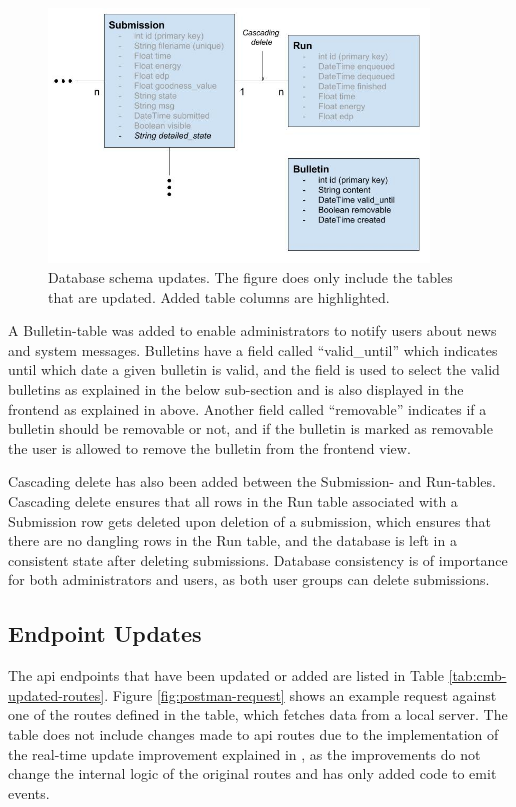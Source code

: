 \begin{figure}
    \includegraphics[width=0.9\textwidth]{figs/updated_database_schema.jpg}
    \caption[Database schema updates]{Database schema updates. The figure does only include the tables that are updated. Added table columns are highlighted.}
    \label{fig:updated-database-schema}
\end{figure}

A Bulletin-table was added to enable administrators to notify users about news and system messages. Bulletins have a field called ``valid\_until'' which indicates until which date a given bulletin is valid, and the field is used to select the valid bulletins as explained in the below sub-section and is also displayed in the frontend as explained in  above. Another field called ``removable'' indicates if a bulletin should be removable or not, and if the bulletin is marked as removable the user is allowed to remove the bulletin from the frontend view.

Cascading delete has also been added between the Submission- and Run-tables. Cascading delete ensures that all rows in the Run table associated with a Submission row gets deleted upon deletion of a submission, which ensures that there are no dangling rows in the Run table, and the database is left in a consistent state after deleting submissions. Database consistency is of importance for both administrators and users, as both user groups can delete submissions.

\subsection{Endpoint Updates}
\label{sub-sec:impr-server-endpoint}
The \gls{api} endpoints that have been updated or added are listed in Table \ref{tab:cmb-updated-routes}. Figure \ref{fig:postman-request} shows an example request against one of the routes defined in the table, which fetches data from a local server. The table does not include changes made to \gls{api} routes due to the implementation of the real-time update improvement explained in , as the improvements do not change the internal logic of the original routes and has only added code to emit events. \\

